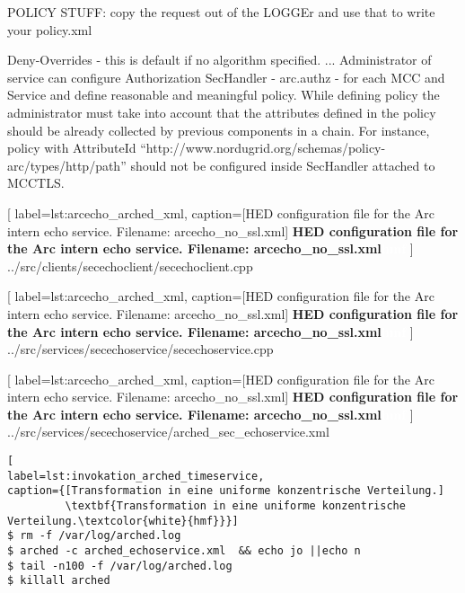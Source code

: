 POLICY STUFF:
copy the request out of the LOGGEr and use that to write your policy.xml

Deny-Overrides - this is default if no algorithm specified.
...
Administrator of service can configure Authorization SecHandler - arc.authz - for each MCC and Service
and define reasonable and meaningful policy. While defining policy the administrator must take into
account that the attributes defined in the policy should be already collected by previous components in a
chain. For instance, policy with AttributeId “http://www.nordugrid.org/schemas/policy-
arc/types/http/path” should not be configured inside SecHandler attached to MCCTLS.


	[
	label=lst:arcecho_arched_xml,
	caption={[HED configuration file for the Arc intern echo service. Filename: arcecho\_no\_ssl.xml]
	\textbf{HED configuration file for the Arc intern echo service. Filename: arcecho\_no\_ssl.xml\textcolor{white}{hmf}}}
	]
{../src/clients/secechoclient/secechoclient.cpp}



	[
	label=lst:arcecho_arched_xml,
	caption={[HED configuration file for the Arc intern echo service. Filename: arcecho\_no\_ssl.xml]
	\textbf{HED configuration file for the Arc intern echo service. Filename: arcecho\_no\_ssl.xml\textcolor{white}{hmf}}}
	]
{../src/services/secechoservice/secechoservice.cpp}




\begin{minipage}[t]{\textwidth}

	[
	label=lst:arcecho_arched_xml,
	caption={[HED configuration file for the Arc intern echo service. Filename: arcecho\_no\_ssl.xml]
	\textbf{HED configuration file for the Arc intern echo service. Filename: arcecho\_no\_ssl.xml\textcolor{white}{hmf}}}
	]
{../src/services/secechoservice/arched_sec_echoservice.xml}
\end{minipage}



\begin{minipage}[t]{\textwidth}
\begin{lstlisting}[
label=lst:invokation_arched_timeservice,
caption={[Transformation in eine uniforme konzentrische Verteilung.]
         \textbf{Transformation in eine uniforme konzentrische Verteilung.\textcolor{white}{hmf}}}]
$ rm -f /var/log/arched.log
$ arched -c arched_echoservice.xml  && echo jo ||echo n
$ tail -n100 -f /var/log/arched.log
$ killall arched
\end{lstlisting}
\end{minipage}



